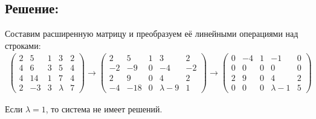\documentclass[12pt]{article}
\begin{document}
    \subsection*{Решение:}
    Составим расширенную матрицу и преобразуем её линейными операциями над строками:
    \begin{gather*}
        \begin{pmatrix}
            2 & 5  & 1 & 3       & 2 \\
            4 & 6  & 3 & 5       & 4 \\
            4 & 14 & 1 & 7       & 4 \\
            2 & -3 & 3 & \lambda & 7
        \end{pmatrix}
        \rightarrow
        \begin{pmatrix}
            2  & 5   & 1 & 3         & 2  \\
            -2 & -9  & 0 & -4        & -2 \\
            2  & 9   & 0 & 4         & 2  \\
            -4 & -18 & 0 & \lambda-9 & 1
        \end{pmatrix}
        \rightarrow
        \begin{pmatrix}
            0 & -4 & 1 & -1          & 0 \\
            0 & 0  & 0 & 0           & 0 \\
            2 & 9  & 0 & 4           & 2 \\
            0 & 0  & 0 & \lambda - 1 & 5
        \end{pmatrix}
    \end{gather*}

    Если $\lambda = 1$, то система не имеет решений.
\end{document}
